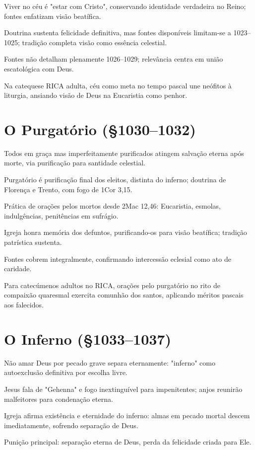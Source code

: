 Viver no céu é "estar com Cristo", conservando identidade verdadeira no Reino; fontes enfatizam visão beatífica.

Doutrina sustenta felicidade definitiva, mas fontes disponíveis limitam-se a 1023--1025; tradição completa visão como essência celestial.

Fontes não detalham plenamente 1026--1029; relevância centra em união escatológica com Deus.

Na catequese RICA adulta, céu como meta no tempo pascal une neófitos à liturgia, ansiando visão de Deus na Eucaristia como penhor.

\section{O Purgatório (\S 1030--1032)}

Todos em graça mas imperfeitamente purificados atingem salvação eterna após morte, via purificação para santidade celestial.

Purgatório é purificação final dos eleitos, distinta do inferno; doutrina de Florença e Trento, com fogo de 1Cor 3,15.

Prática de orações pelos mortos desde 2Mac 12,46: Eucaristia, esmolas, indulgências, penitências em sufrágio.

Igreja honra memória dos defuntos, purificando-os para visão beatífica; tradição patrística sustenta.

Fontes cobrem integralmente, confirmando intercessão eclesial como ato de caridade.

Para catecúmenos adultos no RICA, orações pelo purgatório no rito de compaixão quaresmal exercita comunhão dos santos, aplicando méritos pascais aos falecidos.

\section{O Inferno (\S 1033--1037)}

Não amar Deus por pecado grave separa eternamente: "inferno" como autoexclusão definitiva por escolha livre.

Jesus fala de "Gehenna" e fogo inextinguível para impenitentes; anjos reunirão malfeitores para condenação eterna.

Igreja afirma existência e eternidade do inferno: almas em pecado mortal descem imediatamente, sofrendo separação de Deus.

Punição principal: separação eterna de Deus, perda da felicidade criada para Ele.


